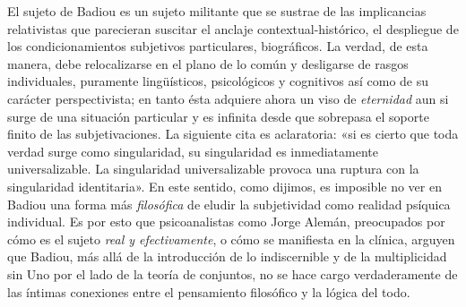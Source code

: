 El sujeto de Badiou es un sujeto militante que se sustrae de las implicancias relativistas que parecieran suscitar el anclaje contextual-histórico, el despliegue de los condicionamientos subjetivos particulares, biográficos. La verdad, de esta manera, debe relocalizarse en el plano de lo común y desligarse de rasgos individuales, puramente lingüísticos, psicológicos y cognitivos así como de su carácter perspectivista; en tanto ésta adquiere ahora un viso de \emph{eternidad} aun si surge de una situación particular y es infinita desde que sobrepasa el soporte finito de las subjetivaciones. La siguiente cita es aclaratoria: «si es cierto que toda verdad surge como singularidad, su singularidad es inmediatamente universalizable. La singularidad universalizable provoca una ruptura con la singularidad identitaria». En este sentido, como dijimos, es imposible no ver en Badiou una forma más \emph{filosófica} de eludir la subjetividad como realidad psíquica individual. Es por esto que psicoanalistas como Jorge Alemán, preocupados por cómo es el sujeto \emph{real y efectivamente}, o cómo se manifiesta en la clínica, arguyen que Badiou, más allá de la introducción de lo indiscernible y de la multiplicidad sin Uno por el lado de la teoría de conjuntos, no se hace cargo verdaderamente de las íntimas conexiones entre el pensamiento filosófico y la lógica del todo.

